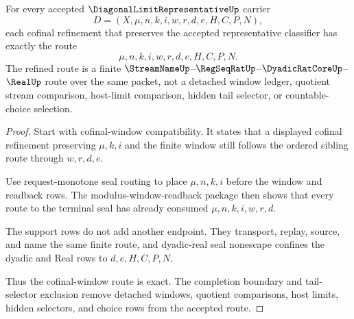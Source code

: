 \begin{theorem}
\label{thm:diagonal-limit-representative-cofinal-window-route-exactness}
For every accepted $\DiagonalLimitRepresentativeUp$ carrier
$$
D=(X,\mu,n,k,i,w,r,d,e,H,C,P,N),
$$
each cofinal refinement that preserves the accepted representative classifier has exactly the route
$$
\mu,n,k,i,w,r,d,e,H,C,P,N.
$$
The refined route is a finite $\StreamNameUp$--$\RegSeqRatUp$--$\DyadicRatCoreUp$--$\RealUp$ route over the same packet, not a detached window ledger, quotient stream comparison, host-limit comparison, hidden tail selector, or countable-choice selection.
\end{theorem}
\begin{proof}
Start with cofinal-window compatibility. It states that a displayed cofinal refinement preserving $\mu,k,i$ and the finite window still follows the ordered sibling route through $w,r,d,e$.

Use request-monotone seal routing to place $\mu,n,k,i$ before the window and readback rows. The modulus-window-readback package then shows that every route to the terminal seal has already consumed $\mu,n,k,i,w,r,d$.

The support rows do not add another endpoint. They transport, replay, source, and name the same finite route, and dyadic-real seal nonescape confines the dyadic and Real rows to $d,e,H,C,P,N$.

Thus the cofinal-window route is exact. The completion boundary and tail-selector exclusion remove detached windows, quotient comparisons, host limits, hidden selectors, and choice rows from the accepted route.
\end{proof}

